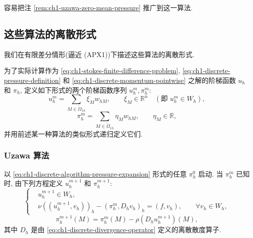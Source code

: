 \begin{Remark}
\label{rem:ch1-arrow-hurwicz-zero-mean-pressure}
容易把注 \ref{rem:ch1-uzawa-zero-mean-pressure} 推广到这一算法.
\end{Remark}

\subsection{这些算法的离散形式}
\label{subsec:ch1-discrete-algorithms}

我们在有限差分情形(逼近 (APX1))下描述这些算法的离散形式.

为了实际计算作为 \eqref{eq:ch1-stokes-finite-difference-problem}, \eqref{eq:ch1-discrete-pressure-definition} 和 \eqref{eq:ch1-discrete-momentum-pointwise} 之解的阶梯函数 $u_h$ 和 $\pi_h$, 定义如下形式的两个阶梯函数序列 $u_h^m,\pi_h^m$:
\begin{equation}
u_h^m=\sum_{M\in\mathring\Omega_{1h}}\xi_Mw_{hM},
\qquad \xi_M\in\mathbb R^n
\quad(\text{即 }u_h^m\in W_h),
\label{eq:ch1-discrete-algorithm-velocity-expansion}
\end{equation}
\begin{equation}
\pi_h^m=\sum_{M\in\mathring\Omega_{1h}}\eta_Mw_{hM},
\qquad \eta_M\in\mathbb R,
\label{eq:ch1-discrete-algorithm-pressure-expansion}
\end{equation}
并用前述某一种算法的类似形式递归定义它们.

\subsubsection*{Uzawa 算法}

以 \eqref{eq:ch1-discrete-algorithm-pressure-expansion} 形式的任意 $\pi_h^0$ 启动. 当 $\pi_h^m$ 已知时, 由下列方程定义 $u_h^{m+1}$ 和 $\pi_h^{m+1}$:
\begin{equation}
\left\{
\begin{aligned}
&u_h^{m+1}\in W_h,\\
&\nu((u_h^{m+1},v_h))_h-(\pi_h^m,D_hv_h)_h=(f,v_h),
\qquad\forall v_h\in W_h,
\end{aligned}
\right.
\label{eq:ch1-discrete-uzawa-velocity-step}
\end{equation}
\begin{equation}
\pi_h^{m+1}(M)=\pi_h^m(M)-\rho(D_hu_h^{m+1})(M),
\label{eq:ch1-discrete-uzawa-pressure-step}
\end{equation}
其中 $D_h$ 是由 \eqref{eq:ch1-discrete-divergence-operator} 定义的离散散度算子.

